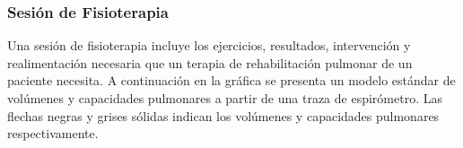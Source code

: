 \documentclass[12pt]{article}
\begin{document}
\subsubsection{Sesión de Fisioterapia}

Una sesión de fisioterapia incluye los ejercicios, resultados, intervención y realimentación necesaria que un terapia de rehabilitación pulmonar de un paciente necesita. A continuación en la gráfica se presenta un modelo estándar de  volúmenes y capacidades pulmonares a partir de una traza de espirómetro. Las flechas negras y grises sólidas indican los volúmenes y capacidades pulmonares respectivamente. 






    
\end{document}
